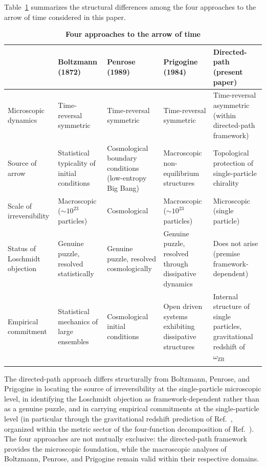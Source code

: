 \documentclass[%
 reprint, amsmath,amssymb, aps, prb, ]{revtex4-2}
\numberwithin{equation}{section}
\newcommand{\omZB}{\omega_{\text{ZB}}}
\begin{document}
Table~\ref{tab:comparison} summarizes the structural differences among the four approaches to the arrow of time considered in this paper.

\begin{table}[t!]
\centering
\caption{\textbf{Four approaches to the arrow of time}}
\label{tab:comparison}
\renewcommand{\arraystretch}{1.4}
\begin{tabular}{p{2.5cm}p{3.0cm}p{3.5cm}p{3.0cm}p{3.0cm}}
\toprule
& \textbf{Boltzmann (1872)}~\cite{Boltzmann1872}
& \textbf{Penrose (1989)}~\cite{Penrose1989}
& \textbf{Prigogine (1984)}~\cite{Prigogine1984}
& \textbf{Directed-path (present paper)} \\
\midrule
Microscopic dynamics
& Time-reversal symmetric
& Time-reversal symmetric
& Time-reversal symmetric
& Time-reversal asymmetric (within directed-path framework) \\
\addlinespace[0.3cm]
Source of arrow
& Statistical typicality of initial conditions
& Cosmological boundary conditions (low-entropy Big Bang)
& Macroscopic non-equilibrium structures
& Topological protection of single-particle chirality \\
\addlinespace[0.3cm]
Scale of irreversibility
& Macroscopic ($\sim 10^{23}$ particles)
& Cosmological
& Macroscopic ($\sim 10^{23}$ particles)
& Microscopic (single particle) \\
\addlinespace[0.3cm]
Status of Loschmidt objection
& Genuine puzzle, resolved statistically
& Genuine puzzle, resolved cosmologically
& Genuine puzzle, resolved through dissipative dynamics
& Does not arise (premise framework-dependent) \\
\addlinespace[0.3cm]
Empirical commitment
& Statistical mechanics of large ensembles
& Cosmological initial conditions
& Open driven systems exhibiting dissipative structures
& Internal structure of single particles, gravitational redshift of $\omZB$~\cite{hanamura22} \\
\addlinespace[0.2cm]
\bottomrule
\end{tabular}
\vspace{0.2cm}
\begin{minipage}{0.95\textwidth}
\justifying\footnotesize
The directed-path approach differs structurally from Boltzmann, Penrose, and Prigogine in locating the source of irreversibility at the single-particle microscopic level, in identifying the Loschmidt objection as framework-dependent rather than as a genuine puzzle, and in carrying empirical commitments at the single-particle level (in particular through the gravitational redshift prediction of Ref.~\cite{hanamura22}, organized within the metric sector of the four-function decomposition of Ref.~\cite{hanamura55}). The four approaches are not mutually exclusive: the directed-path framework provides the microscopic foundation, while the macroscopic analyses of Boltzmann, Penrose, and Prigogine remain valid within their respective domains.
\end{minipage}
\end{table}
\end{document}
